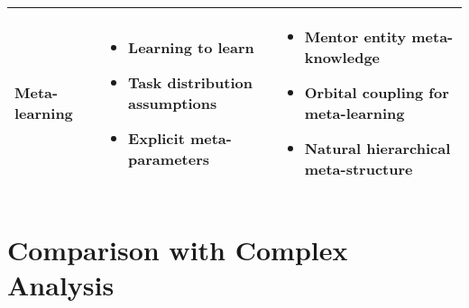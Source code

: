 \begin{center}
\begin{tabular}{|p{3cm}|p{5cm}|p{5cm}|}
\hline
Meta-learning & 
\begin{itemize}
    \item Learning to learn
    \item Task distribution assumptions
    \item Explicit meta-parameters
\end{itemize} &
\begin{itemize}
    \item Mentor entity meta-knowledge
    \item Orbital coupling for meta-learning
    \item Natural hierarchical meta-structure
\end{itemize} \\
\hline
\end{tabular}
\label{tab:learning_comparison}
\end{center}

\section{Comparison with Complex Analysis}


